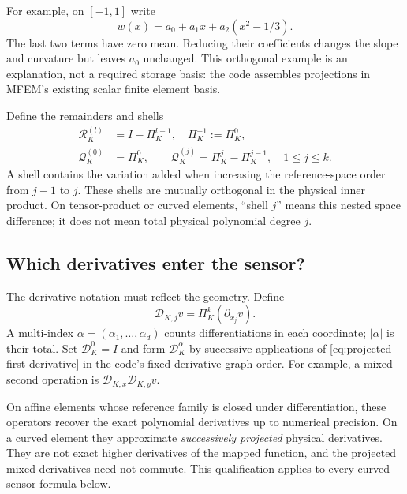 For example, on $[-1,1]$ write
\begin{equation}
 w(x)=a_0+a_1x+a_2(x^2-1/3).
\end{equation}
The last two terms have zero mean. Reducing their coefficients changes the
slope and curvature but leaves $a_0$ unchanged. This orthogonal example is an
explanation, not a required storage basis: the code assembles projections in
MFEM's existing scalar finite element basis.

Define the remainders and shells
\begin{align}
 \mathcal R_K^{(l)}&=I-\Pi_K^{l-1},\quad \Pi_K^{-1}:=\Pi_K^0,
 \label{eq:ofdg-high-pass}\\
 \mathcal Q_K^{(0)}&=\Pi_K^0,\qquad
 \mathcal Q_K^{(j)}=\Pi_K^j-\Pi_K^{j-1},\quad 1\leq j\leq k.
 \label{eq:ofdg-modal-shells}
\end{align}
A shell contains the variation added when increasing the reference-space order
from $j-1$ to $j$. These shells are mutually orthogonal in the physical inner
product. On tensor-product or curved elements, ``shell $j$'' means this nested
space difference; it does not mean total physical polynomial degree $j$.

\subsection{Which derivatives enter the sensor?}
\label{sec:projected-derivatives}
The derivative notation must reflect the geometry. Define
\begin{equation}
 \mathscr D_{K,j}v=\Pi_K^k(\partial_{x_j}v).
 \label{eq:projected-first-derivative}
\end{equation}
A multi-index $\alpha=(\alpha_1,\ldots,\alpha_d)$ counts differentiations in
each coordinate; $|\alpha|$ is their total. Set $\mathscr D_K^0=I$ and form
$\mathscr D_K^\alpha$ by successive applications of \cref{eq:projected-first-derivative}
in the code's fixed derivative-graph order. For example, a mixed second
operation is $\mathscr D_{K,x}\mathscr D_{K,y}v$.

On affine elements whose reference family is closed under differentiation,
these operators recover the exact polynomial derivatives up to numerical
precision. On a curved element they approximate \emph{successively projected}
physical derivatives. They are not exact higher derivatives of the mapped
function, and the projected mixed derivatives need not commute. This
qualification applies to every curved sensor formula below.

